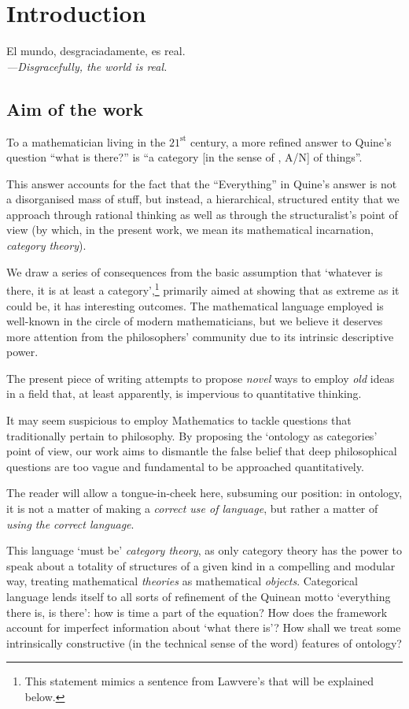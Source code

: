 \section{Introduction}\label{sec_intro}
\epigraph{El mundo, desgraciadamente, es real.\\[2mm]
\footnotesize\emph{---Disgracefully, the world is real.}
}{\cite{confutacion}}
\subsection{Aim of the work}
To a mathematician living in the $21^\text{st}$ century, a more refined answer to Quine's question \cite{quine1948there} ``what is there?'' is ``a category [in the sense of \cite{gtone}, A/N] of things''.

This answer accounts for the fact that the ``Everything'' in Quine's answer is not a disorganised mass of stuff, but instead, a hierarchical, structured entity that we approach through rational thinking as well as through the structuralist's point of view (by which, in the present work, we mean its mathematical incarnation, \emph{category theory}).

We draw a series of consequences from the basic assumption that `whatever is there, it is at least a category',\footnote{This statement mimics a sentence from Lawvere's \cite{lajolla} that will be explained below.} primarily aimed at showing that as extreme as it could be, it has interesting outcomes. The mathematical language employed is well-known in the circle of modern mathematicians, but we believe it deserves more attention from the philosophers' community due to its intrinsic descriptive power.

The present piece of writing attempts to propose \emph{novel} ways to employ \emph{old} ideas in a field that, at least apparently, is impervious to quantitative thinking.

It may seem suspicious to employ Mathematics to tackle questions that traditionally pertain to philosophy. By proposing the `ontology as categories' point of view, our work aims to dismantle the false belief that deep philosophical questions are too vague and fundamental to be approached quantitatively.

The reader will allow a tongue-in-cheek here, subsuming our position: in ontology, it is not a matter of making a \emph{correct use of language}, but rather a matter of \emph{using the correct language}.

This language `must be' \emph{category theory}, as only category theory has the power to speak about a totality of structures of a given kind in a compelling and modular way, treating mathematical \emph{theories} as mathematical \emph{objects}. Categorical language lends itself to all sorts of refinement of the Quinean motto `everything there is, is there': how is time a part of the equation? How does the framework account for imperfect information about `what there is'? How shall we treat some intrinsically constructive (in the technical sense of the word) features of ontology?

